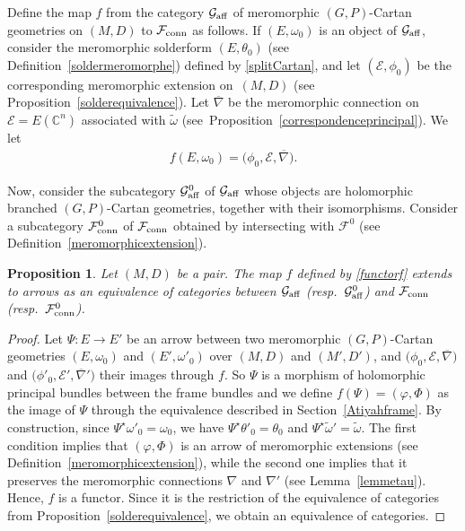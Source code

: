 \documentclass[10pt,a4paper]{amsart}
\numberwithin{equation}{section}
\newtheorem{Proposition}[Theorem]{Proposition}
 { \theoremstyle{definition}
\newtheorem{Definition}[Theorem]{Definition}
\newtheorem{Note}[Theorem]{Note}
\newtheorem{Exemple}[Theorem]{Example}
\newtheorem{Remark}[Theorem]{Remark} }
\begin{document}
Define the map $f$ from the category $\mathcal{G}_{\rm aff}$ of meromorphic $(G,P)$-Cartan geometries on $(M,D)$ to $\mathcal{F}_{\rm conn}$ as follows. If $(E,\omega_0)$ is an object of $\mathcal{G}_{\rm aff}$, consider the meromorphic solderform $(E,\theta_0)$ (see Definition~\ref{soldermeromorphe}) defined by \eqref{splitCartan}, and let $(\mathcal{E},\phi_0)$ be the corresponding meromorphic extension on~$(M,D)$ (see Proposition~\ref{solderequivalence}). Let $\overline{\nabla}$ be the meromorphic connection on $\mathcal{E}=E(\mathbb{C}^n)$ associated with $\tilde{\omega}$ (see~Proposition~\ref{correspondenceprincipal}). We let
 \begin{gather}\label{functorf} f(E,\omega_0)=\big(\phi_0,\mathcal{E},\overline{\nabla}\big).\end{gather}

Now, consider the subcategory $\mathcal{G}_{\rm aff}^0$ of $\mathcal{G}_{\rm aff}$ whose objects are holomorphic branched $(G,P)$-Cartan geometries, together with their isomorphisms. Consider a subcategory $\mathcal{F}_{\rm conn}^0$ of $\mathcal{F}_{\rm conn}$ obtained by intersecting with $\mathcal{F}^0$ (see Definition~\ref{meromorphicextension}).

\begin{Proposition}\label{equivalenceaffineextension} Let $(M,D)$ be a pair. The map $f$ defined by \eqref{functorf} extends to arrows as an equivalence of categories between $\mathcal{G}_{\rm aff}$ \big(resp.\ $\mathcal{G}_{\rm aff}^0$\big) and $\mathcal{F}_{\rm conn}$ \big(resp.\ $\mathcal{F}_{\rm conn}^0$\big).\end{Proposition}
\begin{proof} Let $\Psi\colon E \longrightarrow E'$ be an arrow between two meromorphic $(G,P)$-Cartan geometries $(E,\omega_0)$ and $(E',\omega'_0)$ over $(M,D)$ and $(M',D')$, and $\big(\phi_0,\mathcal{E},\overline{\nabla}\big)$ and $\big(\phi'_0,\mathcal{E}',\overline{\nabla}'\big)$ their images through $f$. So $\Psi$ is a morphism of holomorphic principal bundles between the frame bundles and we define $f(\Psi)=(\varphi,\Phi)$ as the image of $\Psi$ through the equivalence described in Section~\ref{Atiyahframe}. By construction, since $\Psi^\star \omega'_0= \omega_0$, we have $\Psi^\star \theta'_0 = \theta_0$ and $\Psi^\star \tilde{\omega}'=\tilde{\omega}$. The first condition implies that $(\varphi,\Phi)$ is an arrow of meromorphic extensions (see Definition~\ref{meromorphicextension}), while the second one implies that it preserves the meromorphic connections $\nabla$ and $\nabla'$ (see Lemma~\ref{lemmetau}). Hence, $f$ is a functor. Since it is the restriction of the equivalence of categories from Proposition~\ref{solderequivalence}, we obtain an equivalence of categories.
\end{proof}
\end{document}
